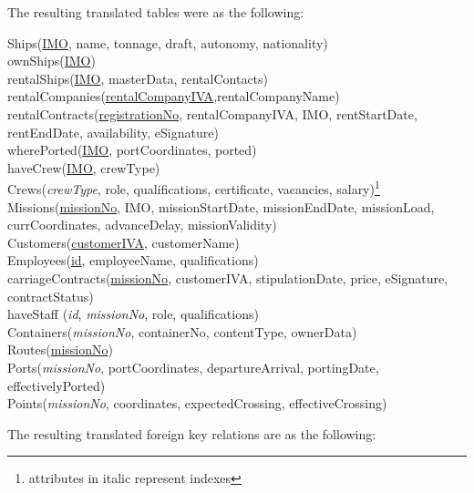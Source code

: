 \documentclass[10pt]{report}
\makeatletter
\newcommand\footnoteref[1]{\protected@xdef\@thefnmark{\ref{#1}}\@footnotemark}
\makeatother
\begin{document}
The resulting translated tables were as the following:
\begin{flushleft}
	Ships(\underline{IMO}, name, tonnage, draft, autonomy, nationality)\\
	ownShips(\underline{IMO})\\
	rentalShips(\underline{IMO}, masterData, rentalContacts)\\
	rentalCompanies(\underline{rentalCompanyIVA},rentalCompanyName)\\
	rentalContracts(\underline{registrationNo}, rentalCompanyIVA, IMO, rentStartDate, rentEndDate, availability, eSignature)\\
	wherePorted(\underline{IMO}, portCoordinates, ported)\\
	haveCrew(\underline{IMO}, crewType)\\
	Crews(\textit{crewType}, role, qualifications, certificate, vacancies, salary)\footnote{\label{italic1}attributes in italic represent indexes}\\
	Missions(\underline{missionNo}, IMO, missionStartDate, missionEndDate, missionLoad, currCoordinates, advanceDelay, missionValidity)\\
	Customers(\underline{customerIVA}, customerName)\\
	Employees(\underline{id}, employeeName, qualifications)\\
	carriageContracts(\underline{missionNo}, customerIVA, stipulationDate, price, eSignature, contractStatus)\\
	haveStaff (\textit{id}, \textit{missionNo}, role, qualifications)\footnoteref{italic1}\\
	Containers(\textit{missionNo}, containerNo, contentType, ownerData)\footnoteref{italic1}\\
	Routes(\underline{missionNo})\\
	Ports(\textit{missionNo}, portCoordinates, departureArrival, portingDate, effectivelyPorted)\footnoteref{italic1}\\
	Points(\textit{missionNo}, coordinates, expectedCrossing, effectiveCrossing)\footnoteref{italic1}\\
\end{flushleft}
The resulting translated foreign key relations are as the following:
\end{document}
